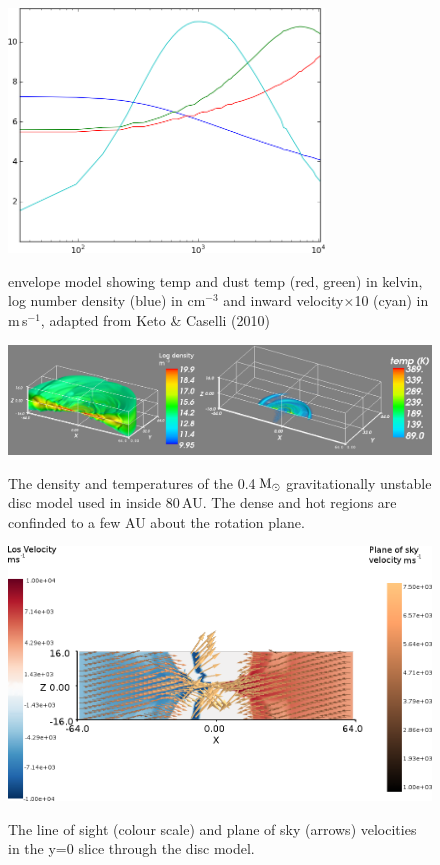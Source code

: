 \documentclass[useAMS,usenatbib]{mn2e}
\begin{document}
\begin{figure}
 \includegraphics[width=84mm]{Figures/model/L1544model_used.png}
 \label{l1544model}
 \caption{envelope model showing temp and dust temp (red, green) in kelvin, log number density (blue) in cm$^{-3}$ and inward velocity$\times$10 (cyan) in m$\,$s$^{-1}$, adapted from Keto \& Caselli (2010)}
\end{figure}

\begin{figure}
 \includegraphics[width=168mm]{Figures/model/rhoT.png}
 \label{discModel}
 \caption{The density and temperatures of the 0.4$\,\rm{M}_\odot$ gravitationally unstable disc model used in inside 80$\,$AU. The dense and hot regions are confinded to a few AU about the rotation plane.}
\end{figure}

\begin{figure}
 \includegraphics[width=168mm]{Figures/model/velocity_rzSlice_thetaColourScale2.png}
 \label{discVel}
 \caption{The line of sight (colour scale) and plane of sky (arrows) velocities in the y=0 slice through the disc model.}
\end{figure}
\end{document}
